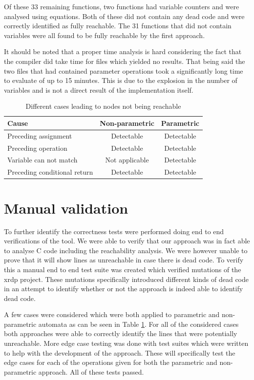 \documentclass[12pt]{article}
\begin{document}
Of these 33 remaining functions, two functions had variable counters and were analysed using equations. Both of these did not contain any dead code and were correctly identified as fully reachable. The 31 functions that did not contain variables were all found to be fully reachable by the first approach.

It should be noted that a proper time analysis is hard considering the fact that the compiler did take time for files which yielded no results. That being said the two files that had contained parameter operations took a significantly long time to evaluate of up to 15 minutes. This is due to the explosion in the number of variables and is not a direct result of the implementation itself.

\begin{table}[b]
	\centering
	\begin{tabular}{ |p{4.2cm}|c|c|  }
		\hline
		Cause	 						& Non-parametric & Parametric\\
		\hline
		Preceding assignment			& Detectable	 & Detectable \\
		\hline
		Preceding operation				& Detectable	 & Detectable \\
		\hline
		Variable can not match		 	& Not applicable & Detectable \\
		\hline
		Preceding conditional return	& Detectable	 & Detectable \\
		\hline
	\end{tabular}
	\caption{Different cases leading to nodes not being reachable}
	\label{table:manual}
\end{table}

\section{Manual validation}
To further identify the correctness tests were performed doing end to end verifications of the tool. We were able to verify that our approach was in fact able to analyse C code including the reachability analysis. We were however unable to prove that it will show lines as unreachable in case there is dead code. To verify this a manual end to end test suite was created which verified mutations of the xrdp project. These mutations specifically introduced different kinds of dead code in an attempt to identify whether or not the approach is indeed able to identify dead code.

A few cases were considered which were both applied to parametric and non-parametric automata as can be seen in Table \ref{table:manual}. For all of the considered cases both approaches were able to correctly identify the lines that were potentially unreachable. More edge case testing was done with test suites which were written to help with the development of the approach. These will specifically test the edge cases for each of the operations given for both the parametric and non-parametric approach. All of these tests passed.
\end{document}
